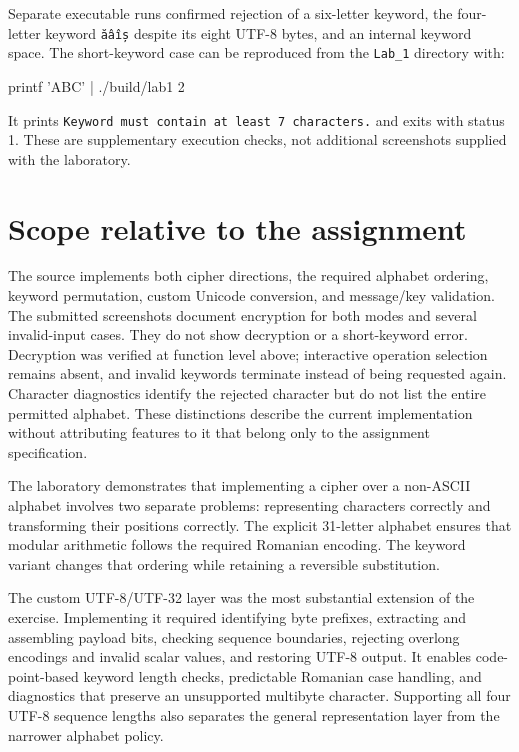 \documentclass{utmreport}
\begin{document}
Separate executable runs confirmed rejection of a six-letter keyword, the four-letter keyword \texttt{ăâîș} despite its eight UTF-8 bytes, and an internal keyword space. The short-keyword case can be reproduced from the \texttt{Lab\_1} directory with:
\begin{console}
printf 'ABC\nROMANA\n' | ./build/lab1 2
\end{console}
It prints \texttt{Keyword must contain at least 7 characters.} and exits with status 1. These are supplementary execution checks, not additional screenshots supplied with the laboratory.

\section{Scope relative to the assignment}
The source implements both cipher directions, the required alphabet ordering, keyword permutation, custom Unicode conversion, and message/key validation. The submitted screenshots document encryption for both modes and several invalid-input cases. They do not show decryption or a short-keyword error. Decryption was verified at function level above; interactive operation selection remains absent, and invalid keywords terminate instead of being requested again. Character diagnostics identify the rejected character but do not list the entire permitted alphabet. These distinctions describe the current implementation without attributing features to it that belong only to the assignment specification.

\utmconclusions
The laboratory demonstrates that implementing a cipher over a non-ASCII alphabet involves two separate problems: representing characters correctly and transforming their positions correctly. The explicit 31-letter alphabet ensures that modular arithmetic follows the required Romanian encoding. The keyword variant changes that ordering while retaining a reversible substitution.

The custom UTF-8/UTF-32 layer was the most substantial extension of the exercise. Implementing it required identifying byte prefixes, extracting and assembling payload bits, checking sequence boundaries, rejecting overlong encodings and invalid scalar values, and restoring UTF-8 output. It enables code-point-based keyword length checks, predictable Romanian case handling, and diagnostics that preserve an unsupported multibyte character. Supporting all four UTF-8 sequence lengths also separates the general representation layer from the narrower alphabet policy.
\end{document}

